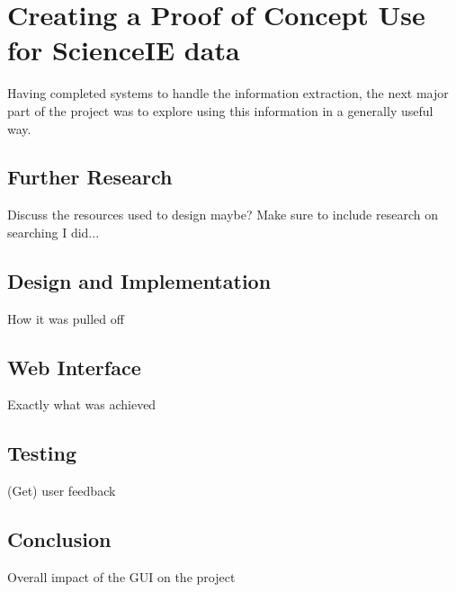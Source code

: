 \chapter{Creating a Proof of Concept Use for ScienceIE data}
Having completed systems to handle the information extraction, the next major part of the project was to explore using this information in a generally useful way. 

\section{Further Research}
Discuss the resources used to design maybe?
Make sure to include research on searching I did...
\section{Design and Implementation}
How it was pulled off
\section{Web Interface}
Exactly what was achieved
\section{Testing}
(Get) user feedback
\section{Conclusion}
Overall impact of the GUI on the project
